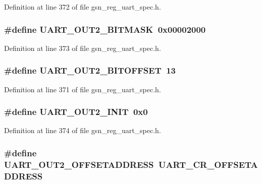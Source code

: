 Definition at line 372 of file gsn\_\-reg\_\-uart\_\-spec.h.

\hypertarget{a00575_a878e0c3a789400f57a13aff39e430e98}{
\subsubsection[{UART\_\-OUT2\_\-BITMASK}]{\setlength{\rightskip}{0pt plus 5cm}\#define UART\_\-OUT2\_\-BITMASK~0x00002000}}
\label{a00575_a878e0c3a789400f57a13aff39e430e98}


Definition at line 373 of file gsn\_\-reg\_\-uart\_\-spec.h.

\hypertarget{a00575_ae9b5d4c96a5b9bf72f65e51a60636d51}{
\subsubsection[{UART\_\-OUT2\_\-BITOFFSET}]{\setlength{\rightskip}{0pt plus 5cm}\#define UART\_\-OUT2\_\-BITOFFSET~13}}
\label{a00575_ae9b5d4c96a5b9bf72f65e51a60636d51}


Definition at line 371 of file gsn\_\-reg\_\-uart\_\-spec.h.

\hypertarget{a00575_ac262e169f3d6fd6b6fba031cebcefa07}{
\subsubsection[{UART\_\-OUT2\_\-INIT}]{\setlength{\rightskip}{0pt plus 5cm}\#define UART\_\-OUT2\_\-INIT~0x0}}
\label{a00575_ac262e169f3d6fd6b6fba031cebcefa07}


Definition at line 374 of file gsn\_\-reg\_\-uart\_\-spec.h.

\hypertarget{a00575_af1683b0cbeb78fa61f1e4617ee5b9cd6}{
\subsubsection[{UART\_\-OUT2\_\-OFFSETADDRESS}]{\setlength{\rightskip}{0pt plus 5cm}\#define UART\_\-OUT2\_\-OFFSETADDRESS~UART\_\-CR\_\-OFFSETADDRESS}}
\label{a00575_af1683b0cbeb78fa61f1e4617ee5b9cd6}


